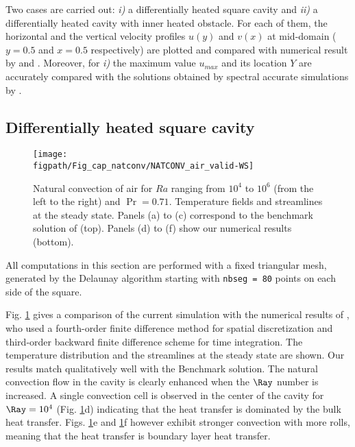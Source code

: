 Two cases are carried out: {\it i)} a differentially heated square cavity and {\it ii)} a differentially heated cavity with inner heated obstacle.
For each of them, the horizontal and the vertical velocity profiles $u(y)$ and $v(x)$ at mid-domain ($y=0.5$ and $x=0.5$ respectively) are plotted and compared with numerical result by \cite{LeQuere91} and \cite{Raluca2013}. 
Moreover, for {\it i)} the maximum value $u_{max}$ and its location $Y$ are accurately compared with the solutions obtained by spectral accurate simulations by \cite{LeQuere91}.

\subsection{Differentially heated square cavity} \label{sub-diff-heated}

\begin{figure}[!h]
	\begin{center}
		\texttt{[image: \\figpath/Fig\_cap\_natconv/NATCONV\_air\_valid-WS]} 
	\end{center}
	\caption{Natural convection of air for $Ra$ ranging from $10^4$ to $10^6$ (from the left to the right) and $\Pr = 0.71$. Temperature fields and streamlines at the steady state. Panels (a) to (c) correspond to the benchmark solution of \cite{Wakashima-2004} (top). Panels (d) to (f) show our numerical results (bottom).}
	\label{fig-natconv-field}
\end{figure}

All computations in this section are performed with a fixed triangular mesh, generated by the Delaunay algorithm starting with \texttt{nbseg = 80} points on each side of the square.

Fig. \ref{fig-natconv-field} gives a comparison of the current simulation with the numerical results of \cite{Wakashima-2004}, who
used a fourth-order finite difference method for spatial discretization and third-order backward finite difference scheme for time integration.
The temperature distribution and the streamlines at the steady state are shown.
Our results match qualitatively well with the Benchmark solution.
The natural convection flow in the cavity is clearly enhanced when the $\Ray$ number is increased.
A single convection cell is observed in the center of the cavity for $\Ray = 10^4$ (Fig. \ref{fig-natconv-field}d) indicating that the heat transfer is dominated by the bulk heat transfer.
Figs. \ref{fig-natconv-field}e and \ref{fig-natconv-field}f however exhibit stronger convection with more rolls, meaning that the heat transfer is boundary layer heat transfer.

